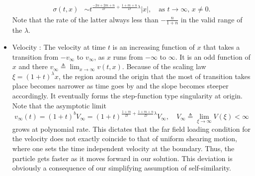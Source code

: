 \documentclass[a4paper,11pt]{article}
\def\red{\color{red}}
\begin{document}
\begin{itemize}
\begin{align*}
 \sigma(t,x) &\sim t^{\frac{-2\alpha+2m+n}{D} +\frac{1+m+n}{D}\lambda}|x|, \quad \text{as $t \rightarrow \infty$, $x\ne0$.}
\end{align*}
{\red Note that the rate of the latter always less than $-\frac{n}{1+n}$ in the valid range of the $\lambda$.}
\item Velocity : The velocity at time $t$ is an increasing function of $x$ that takes a transition from $-v_\infty$ to $v_\infty$, as $x$ runs from $-\infty$ to $\infty$. It is an odd function of $x$ and there $v_\infty\triangleq \lim_{x \rightarrow \infty} v(t,x)$. Because of the scaling law $\xi=(1+t)^\lambda x$, the region around the origin that the  most of transition takes place becomes narrower as time goes by and the slope becomes steeper accordingly. It eventually forms the step-function type singularity at origin. Note that the asymptotic limit $$v_\infty(t)=(1+t)^{b}V_\infty = (1+t)^{\frac{1+m}{D} + \frac{1+m+n}{D}\lambda}V_\infty, \quad V_\infty \triangleq \lim_{\xi \rightarrow \infty} V(\xi) <\infty$$
grows at polynomial rate. This dictates that the far field loading condition for the velocity does not exactly coincide to that of uniform shearing motion, where one sets the time independent velocity at the boundary. Thus, the particle gets faster as it moves forward in our solution. This deviation is obviously a consequence of our simplifying assumption of self-similarity.
\end{itemize}
\end{document}
